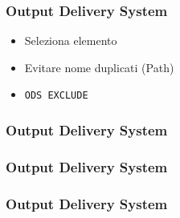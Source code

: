 \begin{frame}[containsverbatim]\frametitle{Output Delivery System}
  \begin{itemize}
  \item
    Seleziona elemento
  \item
    Evitare nome duplicati (Path)
  \item
    \verb+ODS EXCLUDE+
  \end{itemize}
\end{frame}

\begin{frame}[containsverbatim]\frametitle{Output Delivery System}
\end{frame}


\begin{frame}[containsverbatim]\frametitle{Output Delivery System}
\end{frame}


\begin{frame}[containsverbatim]\frametitle{Output Delivery System}
\end{frame}

\begin{comment}
  \begin{frame}[containsverbatim]\frametitle{Grafici}
    \VerbatimInput{code/grafici1.sas}
  \end{frame}

  \begin{frame}[containsverbatim]\frametitle{Grafici 2}
    \VerbatimInput{code/grafici2.sas}
  \end{frame}

  \begin{frame}[containsverbatim]\frametitle{Grafici e Proc Corr}
    \VerbatimInput{code/grafici3.sas}
  \end{frame}


  \begin{frame}[containsverbatim]\frametitle{Grafici e Proc Reg}
    \VerbatimInput{code/grafici4.sas}
  \end{frame}
\end{comment}






